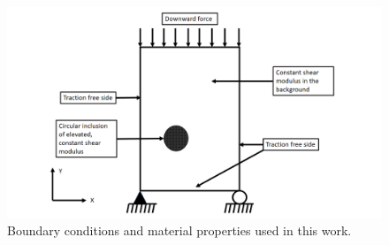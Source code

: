 \documentclass[12pt]{article}
\begin{document}
%
\begin{figure}[h] 
   \centering
    \includegraphics[totalheight=9cm]{Figures/bc.png}
  \caption{\label{fig:bc}Boundary conditions and material properties used in this work. }
\end{figure}
%
\end{document}
